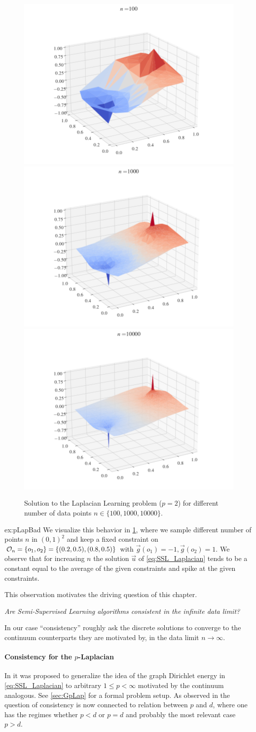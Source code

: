 \begin{figure}
\includegraphics[width=.28\textwidth, trim={3.1cm 1cm 3.5cm 0cm},clip]{code/SSL/2Dex_100.png}%
\hfill%
\includegraphics[width=.28\textwidth,trim={3.1cm 1cm 3.5cm 0cm},clip]{code/SSL/2Dex_1000.png}%
\hfill%
\includegraphics[width=.28\textwidth,trim={3.1cm 1cm 3.5cm 0cm},clip]{code/SSL/2Dex_10000.png}%
%
\caption{Solution to the Laplacian Learning problem ($p=2$) for different number of data points $n\in\{100,1000,10000\}$.}\label{fig:pdeg}
\end{figure}
%
%
\begin{example}{}{ex:pLapBad}
We visualize this behavior in \cref{fig:pdeg}, where we sample different number of points $n$ in $(0,1)^2$ and keep a fixed constraint on $\mathcal{O}_n=\{o_1, o_2\}=\{(0.2,0.5), (0.8, 0.5)\}$ with $\vec g(o_1) = -1, \vec g(o_2)=1$. We observe that for increasing $n$ the solution $\vec u$ of \cref{eq:SSL_Laplacian} tends to be a constant equal to the average of the given constraints and spike at the given constraints.
\end{example}
%
%
\noindent%
This observation motivates the driving question of this chapter.
%
\begin{center}
\textit{%
Are Semi-Supervised Learning algorithms consistent in the infinite data limit?}
\end{center}
%
In our case \enquote{consistency} roughly ask the discrete solutions to converge to the continuum counterparts they are motivated by, in the data limit $n\to\infty$.
%
%
\paragraph{Consistency for the $p$-Laplacian} 
In \cite{zhou2005regularization} it was proposed to generalize the idea of the graph Dirichlet energy in \cref{eq:SSL_Laplacian} to arbitrary $1\leq p < \infty$ motivated by the continuum analogous. See \cref{sec:GpLap} for a formal problem setup. As observed in \cite{nadler2009statistical, alamgir2011phase, el2016asymptotic} the question of consistency is now connected to relation between $p$ and $d$, where one has the regimes whether $p<d$ or  $p=d$ and probably the most relevant case $p>d$.

